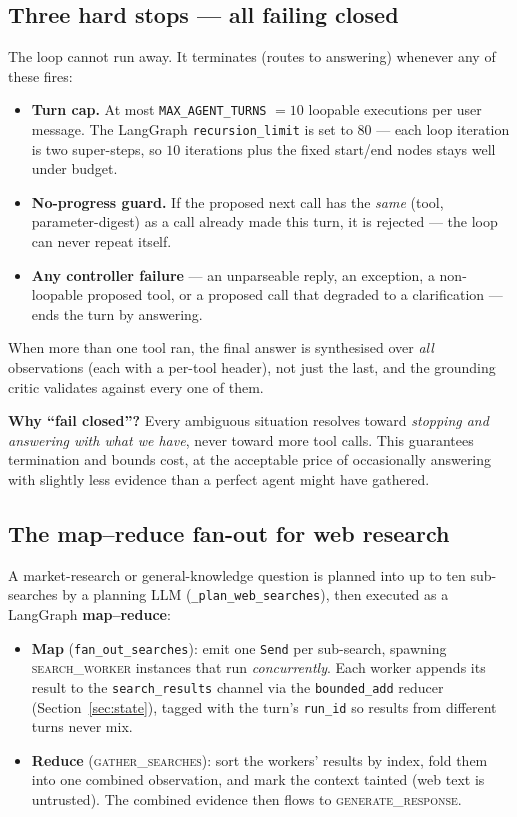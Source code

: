 \documentclass[11pt,a4paper]{article}
\newcommand{\code}[1]{\texttt{\small #1}}
\newcommand{\gnode}[1]{\textsc{#1}}  %
\begin{document}
\subsection{Three hard stops --- all failing closed}
The loop cannot run away. It terminates (routes to answering) whenever any of these
fires:
\begin{itemize}[leftmargin=1.4em,itemsep=2pt]
  \item \textbf{Turn cap.} At most \code{MAX\_AGENT\_TURNS} $=10$ loopable executions
        per user message. The LangGraph \code{recursion\_limit} is set to $80$ ---
        each loop iteration is two super-steps, so $10$ iterations plus the fixed
        start/end nodes stays well under budget.
  \item \textbf{No-progress guard.} If the proposed next call has the \emph{same}
        (tool, parameter-digest) as a call already made this turn, it is rejected ---
        the loop can never repeat itself.
  \item \textbf{Any controller failure} --- an unparseable reply, an exception, a
        non-loopable proposed tool, or a proposed call that degraded to a clarification
        --- ends the turn by answering.
\end{itemize}
When more than one tool ran, the final answer is synthesised over \emph{all}
observations (each with a per-tool header), not just the last, and the grounding
critic validates against every one of them.

\begin{intuition}
\textbf{Why ``fail closed''?} Every ambiguous situation resolves toward
\emph{stopping and answering with what we have}, never toward more tool calls. This
guarantees termination and bounds cost, at the acceptable price of occasionally
answering with slightly less evidence than a perfect agent might have gathered.
\end{intuition}

\subsection{The map--reduce fan-out for web research}
A market-research or general-knowledge question is planned into up to ten
sub-searches by a planning LLM (\code{\_plan\_web\_searches}), then executed as a
LangGraph \textbf{map--reduce}:
\begin{itemize}[leftmargin=1.4em,itemsep=2pt]
  \item \textbf{Map} (\code{fan\_out\_searches}): emit one \code{Send} per sub-search,
        spawning \gnode{search\_worker} instances that run \emph{concurrently}. Each
        worker appends its result to the \code{search\_results} channel via the
        \code{bounded\_add} reducer (Section~\ref{sec:state}), tagged with the turn's
        \code{run\_id} so results from different turns never mix.
  \item \textbf{Reduce} (\gnode{gather\_searches}): sort the workers' results by index,
        fold them into one combined observation, and mark the context tainted (web
        text is untrusted). The combined evidence then flows to
        \gnode{generate\_response}.
\end{itemize}
\end{document}
